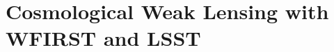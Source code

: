 %
%
%
%
%
%
%

\section{Cosmological Weak Lensing with WFIRST and LSST}
\def\secname{\chpname:weaklensing}\label{sec:\secname}




